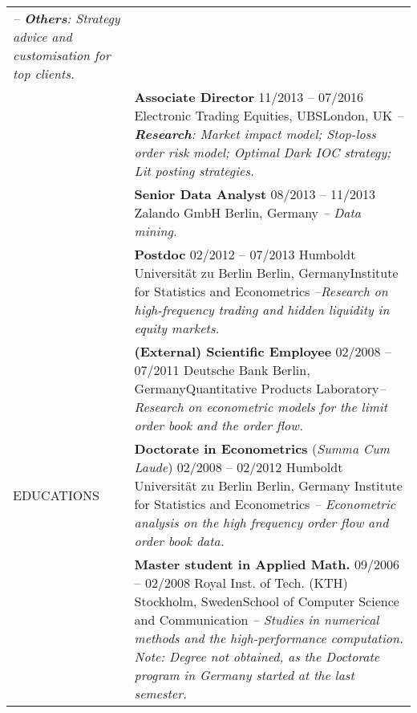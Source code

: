 \documentclass[a4paper,10pt]{article}
\begin{document}
\begin{longtable}[h]{p{}p{}}
    \emph{-- \textbf{Others}: Strategy advice and customisation for top clients.}\\ 
  & \textbf{Associate Director} \hfill 11/2013 -- 07/2016 \newline Electronic Trading Equities, UBS\hfill London, UK\newline  
  \emph{-- \textbf{Research}: Market impact model; Stop-loss order risk model; Optimal Dark IOC strategy; Lit posting strategies.}\\
  & \textbf{Senior Data Analyst} \hfill 08/2013 -- 11/2013 \newline Zalando GmbH \hfill Berlin, Germany \newline  
  \emph{-- Data mining.} \\
  & \textbf{Postdoc} \hfill 02/2012 -- 07/2013 \newline Humboldt Universit\"at zu Berlin \hfill Berlin, Germany\newline Institute for Statistics and Econometrics \newline \emph{--Research on high-frequency trading and hidden liquidity in equity markets.} \\
  & \textbf{(External) Scientific Employee} \hfill 02/2008 -- 07/2011 \newline Deutsche Bank \hfill Berlin, Germany\newline Quantitative Products Laboratory\newline \emph{-- Research on econometric models for the limit order book and the order flow.} \\
  EDUCATIONS
& \textbf{Doctorate in Econometrics} \small{(\emph{Summa Cum Laude})} \hfill 02/2008 -- 02/2012 \newline Humboldt Universit\"at zu Berlin \hfill Berlin, Germany \newline Institute for Statistics and Econometrics\newline
\emph{-- Econometric analysis on the high frequency order flow and order book data.}\\
  & \textbf{Master student in Applied Math.} \hfill 09/2006 -- 02/2008 \newline Royal Inst. of Tech. (KTH) \hfill Stockholm, Sweden\newline School of Computer Science and Communication \newline
  \emph{-- Studies in numerical methods and the high-performance computation. Note: Degree not obtained, as the Doctorate program in Germany started at the last semester.} \\

\end{longtable}
\end{document}
